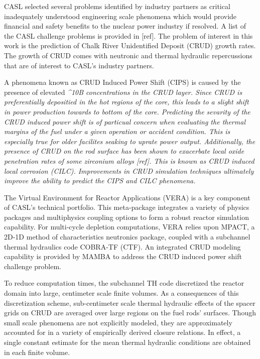 CASL selected several problems identified by industry partners as critical
inadequately understood engineering scale phenomena which would provide financial and
safety benefits to the nuclear power industry if resolved.  A list of the CASL
challenge problems is provided in [ref].  The problem of interest in this
work is the prediction of Chalk River Unidentified Deposit (CRUD) growth rates.
The growth of CRUD comes with neutronic and thermal hydraulic repercussions that are of
interest to CASL's industry partners.  

A phenomena known as CRUD Induced Power Shift (CIPS) is caused by the presence of elevated \em{^{10}B} concentrations in the CRUD layer.  Since CRUD is preferentially depositied in the hot regions of the core, this leads to a slight shift in power production towards to bottom of the core.  Predicting the sevarity of the CRUD induced power shift is of particual concern when evaluating the
thermal margins of the fuel under a given operation or accident condition.  This is especially true for older facilites seaking to uprate power output.
Additionally, the presence of CRUD on the rod
surface has been shown to exacerbate local oxide penetration rates of some zirconium alloys [ref].
This is known as CRUD induced local corrosion (CILC).  Improvements in CRUD simulation techniques ultimately improve the ability to predict the CIPS and CILC phenomena.

The Virtual Environment for Reactor Applications (VERA) is a key component of
CASL's technical portfolio.  This meta-package integrates a variety of physics
packages and multiphysics coupling options to form a robust reactor simulation
capability.  For multi-cycle depletion computations, VERA relies upon MPACT, a
2D-1D method of characteristics neutronics package, coupled with a subchannel
thermal hydraulics code COBRA-TF (CTF).  An integrated CRUD modeling capability
is provided by MAMBA to address the CRUD induced power shift challenge problem.

To reduce computation times, the subchannel TH code discretized the reactor
domain into large, centimeter scale finite volumes. As a consequences of this discretization scheme, sub-centimeter scale
thermal hydraulic effects of the spacer grids on CRUD are averaged over
large regions on the fuel rods' surfaces.  Though small scale phenomena are not
explicitly modeled, they are approximately accounted for in a variety of empirically derived
closure relations.  In effect, a single constant estimate for the mean thermal
hydraulic conditions are obtained in each finite volume.

